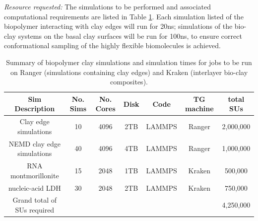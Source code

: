 

\emph{Resource requested:} The simulations to be performed and associated computational requirements are listed in Table \ref{t:claytable}. Each simulation listed of the biopolymer interacting with clay edges will run for 20ns; simulations of the bio-clay systems on the basal clay surfaces will be run for 100ns, to ensure correct conformational sampling of the highly flexible biomolecules is achieved.
 
\begin{table}[!h]
\centering

\begin{tabular}[b]
{|>{\scriptsize}c|>{\scriptsize}c|>{\scriptsize}
c|>{\scriptsize}c|>{\scriptsize}c|>{\scriptsize}c|>{\scriptsize}c|}
\hline
\textbf{Sim Description} & \textbf{No. Sims} &
\textbf{No. Cores} & \textbf{Disk} &
\textbf{Code} & \textbf{TG machine} & \textbf{total SUs}\\
\hline 
Clay edge simulations &  10 & 4096 & 2TB & LAMMPS & Ranger & 2,000,000  \\
\hline
NEMD clay edge simulations & 40 & 4096 & 4TB & LAMMPS & Ranger & 1,000,000 \\
\hline
RNA montmorillonite &  15  & 2048 & 1TB & LAMMPS & Kraken & 500,000 \\
\hline
nucleic-acid LDH & 30 & 2048 & 2TB & LAMMPS & Kraken & 750,000 \\ 
\hline
Grand total of SUs required & & & & & & 4,250,000  \\
\hline
\end{tabular} 
\caption{Summary of biopolymer clay simulations and
simulation times for jobs to be run on Ranger (simulations containing clay edges) and Kraken (interlayer bio-clay composites).}
\label{t:claytable}
\end{table}
      
